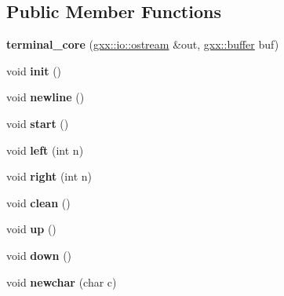 \subsection*{Public Member Functions}
\begin{DoxyCompactItemize}
\item 
{\bfseries terminal\+\_\+core} (\hyperlink{classgxx_1_1io_1_1ostream}{gxx\+::io\+::ostream} \&out, \hyperlink{classgxx_1_1buffer}{gxx\+::buffer} buf)\hypertarget{classgxx_1_1terminal__core_a8cfa6715728dc02f92eb54fc2c6b8858}{}\label{classgxx_1_1terminal__core_a8cfa6715728dc02f92eb54fc2c6b8858}

\item 
void {\bfseries init} ()\hypertarget{classgxx_1_1terminal__core_a6e6caad870e41f1b64823dacc8e60533}{}\label{classgxx_1_1terminal__core_a6e6caad870e41f1b64823dacc8e60533}

\item 
void {\bfseries newline} ()\hypertarget{classgxx_1_1terminal__core_aabb78cfa5ea8ed3d461aef576d39dc73}{}\label{classgxx_1_1terminal__core_aabb78cfa5ea8ed3d461aef576d39dc73}

\item 
void {\bfseries start} ()\hypertarget{classgxx_1_1terminal__core_a52fd6fc8f4c6cb96f8d3f963fe6fc112}{}\label{classgxx_1_1terminal__core_a52fd6fc8f4c6cb96f8d3f963fe6fc112}

\item 
void {\bfseries left} (int n)\hypertarget{classgxx_1_1terminal__core_a06608cf867c0878701bb8ae890ea91e9}{}\label{classgxx_1_1terminal__core_a06608cf867c0878701bb8ae890ea91e9}

\item 
void {\bfseries right} (int n)\hypertarget{classgxx_1_1terminal__core_a2fcfc94977f8d659da46c6ddd784802a}{}\label{classgxx_1_1terminal__core_a2fcfc94977f8d659da46c6ddd784802a}

\item 
void {\bfseries clean} ()\hypertarget{classgxx_1_1terminal__core_a9f3e65e794d48e22bf0879b56b56e7dd}{}\label{classgxx_1_1terminal__core_a9f3e65e794d48e22bf0879b56b56e7dd}

\item 
void {\bfseries up} ()\hypertarget{classgxx_1_1terminal__core_af076ecc6a0b86cd29df16eac80698921}{}\label{classgxx_1_1terminal__core_af076ecc6a0b86cd29df16eac80698921}

\item 
void {\bfseries down} ()\hypertarget{classgxx_1_1terminal__core_a066db769952939d10fb6227f36919ea4}{}\label{classgxx_1_1terminal__core_a066db769952939d10fb6227f36919ea4}

\item 
void {\bfseries newchar} (char c)\hypertarget{classgxx_1_1terminal__core_a2ddf5d201dfe6ce3ebe1a11d836a2532}{}\label{classgxx_1_1terminal__core_a2ddf5d201dfe6ce3ebe1a11d836a2532}

\end{DoxyCompactItemize}
